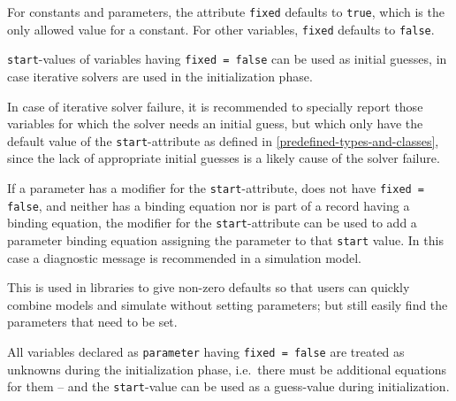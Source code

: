 For constants and parameters, the attribute \lstinline!fixed! defaults to \lstinline!true!, which is the only allowed value for a constant.  For other variables,
\lstinline!fixed! defaults to \lstinline!false!.

\lstinline!start!-values of variables having \lstinline!fixed = false! can be used as initial guesses, in case iterative solvers are used in the initialization phase.

\begin{nonnormative}
In case of iterative solver failure, it is recommended to specially report those variables for which the solver needs an initial guess, but which only have the default value of the \lstinline!start!-attribute as defined in \cref{predefined-types-and-classes}, since the lack of appropriate initial guesses is a likely cause of the solver failure.
\end{nonnormative}

If a parameter has a modifier for the \lstinline!start!-attribute, does not have \lstinline!fixed = false!, and neither has a binding equation nor is part of a record having a binding equation, the modifier for the \lstinline!start!-attribute can be used to add a parameter binding equation assigning the parameter to that \lstinline!start! value.
In this case a diagnostic message is recommended in a simulation model.

\begin{nonnormative}
This is used in libraries to give non-zero defaults so that users can quickly combine models and simulate without setting parameters; but still easily find the parameters
that need to be set.
\end{nonnormative}

All variables declared as \lstinline!parameter! having \lstinline!fixed = false! are treated as unknowns during the initialization phase, i.e.\ there must be additional equations for them -- and
the \lstinline!start!-value can be used as a guess-value during initialization.

